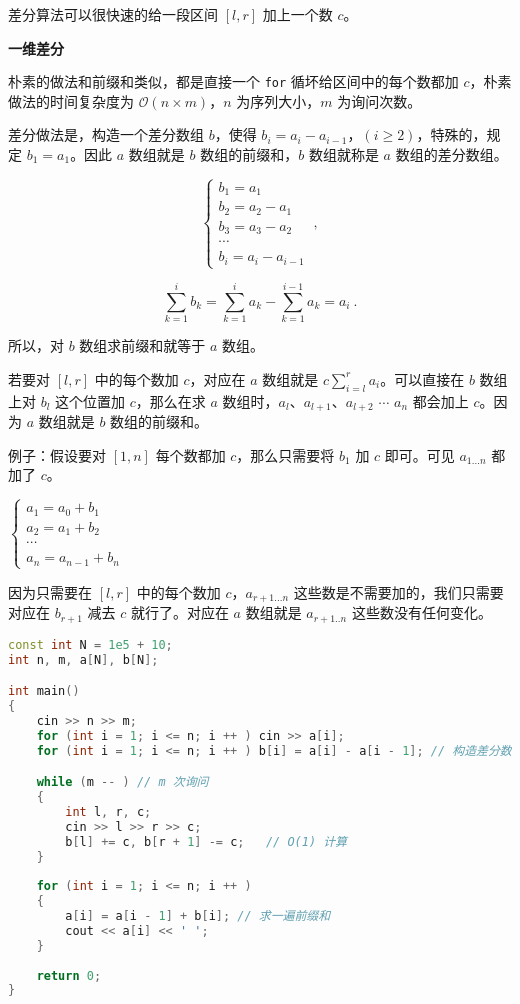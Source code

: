 
差分算法可以很快速的给一段区间 $[l, r]$ 加上一个数 $c$。

\textbf{一维差分}

朴素的做法和前缀和类似，都是直接一个 \verb|for| 循坏给区间中的每个数都加 $c$，朴素做法的时间复杂度为 $\mathcal{O}(n \times m)$，$n$ 为序列大小，$m$ 为询问次数。

差分做法是，构造一个差分数组 $b$，使得 $b_i = a_i - a_{i - 1}$，$(i \geq 2)$，特殊的，规定 $b_1 = a_1$。因此 $a$ 数组就是 $b$ 数组的前缀和，$b$ 数组就称是 $a$ 数组的差分数组。

$$\begin{cases}
b_1 = a_1 \\
b_2 = a_2 - a_1 \\
b_3 = a_3 - a_2 \\
\cdots \\
b_i = a_i - a_{i - 1}
\end{cases}~,$$

\begin{equation}
\sum^i_{k = 1}b_k = \sum^{i}_{k = 1} a_k - \sum^{i - 1}_{k = 1} a_k = a_i~.
\end{equation}

所以，对 $b$ 数组求前缀和就等于 $a$ 数组。

若要对 $[l, r]$ 中的每个数加 $c$，对应在 $a$ 数组就是 $c\sum^r_{i= l}a_i$。可以直接在 $b$ 数组上对 $b_l$ 这个位置加 $c$，那么在求 $a$ 数组时，$a_l$、$a_{l + 1}$、$a_{l + 2}$ $\cdots$ $a_n$ 都会加上 $c$。因为 $a$ 数组就是 $b$ 数组的前缀和。

例子：假设要对 $[1, n]$ 每个数都加 $c$，那么只需要将 $b_1$ 加 $c$ 即可。可见 $a_{1 ... n}$ 都加了 $c$。

$\begin{cases}
a_1 = a_0 + b_1 \\
a_2 = a_1 + b_2 \\
\cdots \\ 
a_n = a_{n - 1} + b_n
\end{cases}$

因为只需要在 $[l, r]$ 中的每个数加 $c$，$a_{r + 1 ... n}$ 这些数是不需要加的，我们只需要对应在 $b_{r + 1}$ 减去 $c$ 就行了。对应在 $a$ 数组就是 $a_{r + 1..n}$ 这些数没有任何变化。

\begin{lstlisting}[language=cpp]
const int N = 1e5 + 10;
int n, m, a[N], b[N];

int main() 
{
    cin >> n >> m;  
    for (int i = 1; i <= n; i ++ ) cin >> a[i];
    for (int i = 1; i <= n; i ++ ) b[i] = a[i] - a[i - 1]; // 构造差分数组

    while (m -- ) // m 次询问
    {
        int l, r, c;
        cin >> l >> r >> c;
        b[l] += c, b[r + 1] -= c;   // O(1) 计算
    }
    
    for (int i = 1; i <= n; i ++ ) 
    {
        a[i] = a[i - 1] + b[i]; // 求一遍前缀和
        cout << a[i] << ' ';   
    }
    
    return 0;
}
\end{lstlisting}

